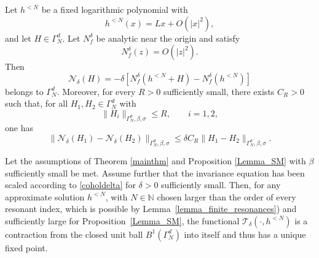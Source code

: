 \documentclass[10pt,a4paper]{amsart}
\begin{document}
\begin{lemma}\label{lemma_affine_tail}
Let $h^{<N}$ be a fixed logarithmic polynomial with
\begin{equation}
        h^{<N}(x)=Lx+O(|x|^2),
\end{equation}
and let $H\in\Gamma_N^d$. Let $N_f^\delta$ be analytic near the origin and satisfy
\begin{equation}
        N_f^\delta(z)=O(|z|^2).
\end{equation}
Then
\begin{equation}\label{N_delta}
        \mathcal N_\delta(H)
        =
        -\delta\left[
        N_f^\delta(h^{<N}+H)-N_f^\delta(h^{<N})
        \right]
\end{equation}
belongs to $\Gamma_N^d$. Moreover, for every $R>0$ sufficiently small, there exists
$C_R>0$ such that, for all $H_1,H_2\in\Gamma_N^d$ with
\begin{equation}
        \|H_i\|_{\Gamma_N^d,\beta,\sigma}\leq R,
        \qquad i=1,2,
\end{equation}
one has
\begin{equation}\label{bound_difference_N_delta}
        \|\mathcal N_\delta(H_1)-\mathcal N_\delta(H_2)\|_{\Gamma_N^d,\beta,\sigma}
        \le
        \delta C_R
        \|H_1-H_2\|_{\Gamma_N^d,\beta,\sigma}.
\end{equation}
\end{lemma}

\begin{proposition}\label{propfixedpoint}
Let the assumptions of Theorem \ref{mainthm} and Proposition \ref{Lemma_SM} with
$\beta$ sufficiently small be met. Assume further that the invariance equation has been
scaled according to \eqref{coholdelta} for $\delta>0$ sufficiently small. Then, for any
approximate solution $h^{<N}$, with $N\in\mathbb N$ chosen larger than the order of every resonant index, which is possible by Lemma~\ref{lemma_finite_resonances}) and sufficiently large for Proposition~\ref{Lemma_SM}, the functional $\mathcal T_\delta(\cdot,h^{<N})$ is a contraction from the
closed unit ball $B^1(\Gamma_N^d)$ into itself and thus has a unique fixed point.
\end{proposition}
\end{document}
